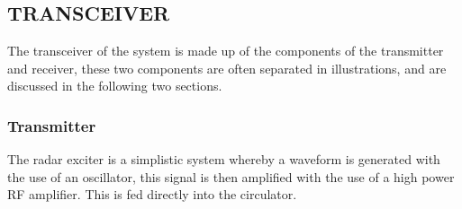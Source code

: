 \documentclass[11pt]{witseiepaper}
\begin{document}
\begin{bibunit}[witseie]
\section{TRANSCEIVER} \label{sec:Transceiver}
The transceiver of the system is made up of the components of the transmitter and receiver, these two components are often separated in illustrations, and are discussed in the following two sections.
\subsubsection{Transmitter} \label{sec:Transmitter}
The radar exciter is a simplistic system whereby a waveform is generated with the use of an oscillator, this signal is then amplified with the use of a high power RF amplifier. This is fed directly into the circulator.


\end{bibunit}
\end{document}
